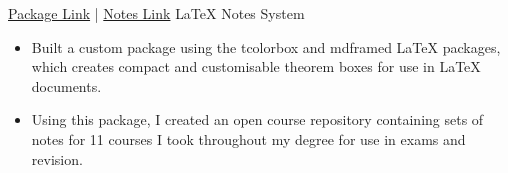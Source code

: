 \documentclass[../../cv-cs.tex]{subfiles}
\begin{document}
%
\cvlinkevent
{\href{https:www.github.com/leon0241/leon-latex-thmboxes}{Package Link} | \href{https:www.github.com/leon0241/leon-latex-notes}{Notes Link}}
{LaTeX Notes System}
{
    \begin{itemize}
	\item Built a custom package using the tcolorbox and mdframed LaTeX packages, which creates compact and customisable theorem boxes for use in LaTeX documents.
	\item Using this package, I created an open course repository containing sets of notes for 11 courses I took throughout my degree for use in exams and revision.
    \end{itemize}
}
\end{document}
